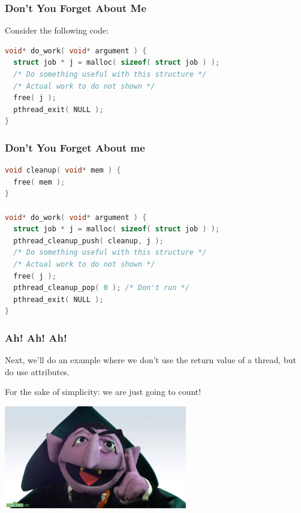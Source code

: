 \begin{frame}[fragile]
	\frametitle{Don't You Forget About Me}

	Consider the following code:
	\begin{lstlisting}[language=C]
void* do_work( void* argument ) {
  struct job * j = malloc( sizeof( struct job ) );
  /* Do something useful with this structure */
  /* Actual work to do not shown */
  free( j );
  pthread_exit( NULL );
}
\end{lstlisting}


\end{frame}



\begin{frame}[fragile]
	\frametitle{Don't You Forget About me}

	\begin{lstlisting}[language=C]
void cleanup( void* mem ) {
  free( mem );
}

void* do_work( void* argument ) {
  struct job * j = malloc( sizeof( struct job ) );
  pthread_cleanup_push( cleanup, j );
  /* Do something useful with this structure */
  /* Actual work to do not shown */
  free( j );
  pthread_cleanup_pop( 0 ); /* Don't run */
  pthread_exit( NULL );
}
\end{lstlisting}


\end{frame}


\begin{frame}
	\frametitle{Ah! Ah! Ah!}

	Next, we'll do an example where we don't use the return value of a thread, but do use attributes.

	For the sake of simplicity: we are just going to count!

	\begin{center}
		\includegraphics[width=0.6\textwidth]{images/countvoncount.jpg}
	\end{center}


\end{frame}



